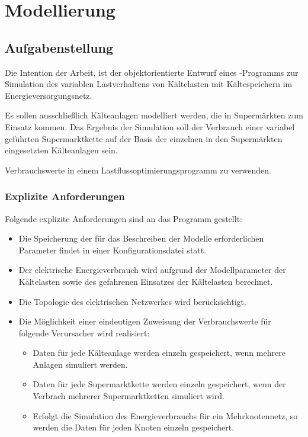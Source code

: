 \chapter{Modellierung}
\label{chap:SEVN}
\minitoc

\section{Aufgabenstellung}
\label{sec:aufst}


Die Intention der Arbeit, ist der objektorientierte Entwurf eines
\matlab-Programms zur Simulation des variablen Lastverhaltens von Kältelasten
mit Kältespeichern im Energieversorgungsnetz. 

Es sollen ausschlie\ss lich K\"alteanlagen modelliert werden, die in
Superm\"arkten zum Einsatz kommen. Das Ergebnis der Simulation soll der
Verbrauch einer variabel gef\"uhrten Supermarktkette auf der Basis der einzelnen
in den Superm\"arkten eingesetzten K\"alteanlagen sein.

Verbrauchswerte in einem Lastflussoptimierungsprogramm zu verwenden.

\subsection*{Explizite Anforderungen}

Folgende explizite Anforderungen sind an das Programm gestellt:

\begin{itemize}
	\item Die Speicherung der f\"ur das Beschreiben der Modelle
	erforderlichen Parameter findet in einer Konfigurationsdatei statt.
	\item Der elektrische Energieverbrauch wird aufgrund der Modellparameter
	der Kältelasten sowie des gefahrenen Einsatzes der Kältelasten
	berechnet.
	\item Die Topologie des elektrischen Netzwerkes wird ber\"ucksichtigt.
	\item Die M\"oglichkeit einer eindeutigen Zuweisung der Verbrauchswerte
	f\"ur folgende Verursacher wird realisiert:
	\begin{itemize}
		\item Daten f\"ur jede K\"alteanlage werden einzeln gespeichert,
		wenn mehrere Anlagen simuliert werden.
		\item Daten f\"ur jede Supermarktkette werden einzeln
		gespeichert, wenn der Verbrach mehrerer Supermarktketten
		simuliert wird.
		\item Erfolgt die Simulation des Energieverbrauchs f\"ur ein
		Mehrknotennetz, so werden die Daten f\"ur jeden Knoten einzeln
		gespeichert.
	\end{itemize}
\end{itemize}



